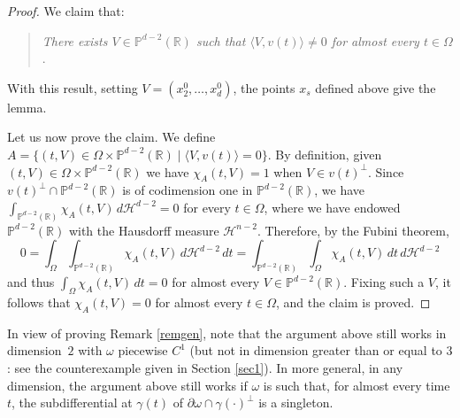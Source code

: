 \documentclass[10pt]{amsart}
\def\R{\mathbb{R}}
\theoremstyle{definition}
\begin{document}
\begin{proof}
We claim that:
\begin{quote}
\textit{There exists $V\in \mathbb{P}^{d-2}(\R)$ such that $\langle V,v(t)\rangle\neq 0$ for almost every $t\in\Omega$}.
\end{quote}
With this result, setting $V=(x_2^0,\ldots,x_d^0)$, the points $x_s$ defined above give the lemma.

Let us now prove the claim.
We define $A=\{ (t,V)\in\Omega\times\mathbb{P}^{d-2}(\R)\mid \langle V,v(t)\rangle=0\}$. By definition, given $(t,V)\in\Omega\times\mathbb{P}^{d-2}(\R)$ we have $\chi_A(t,V)=1$ when $V\in v(t)^\perp$. Since $v(t)^\perp\cap\mathbb{P}^{d-2}(\R)$ is of codimension one in $\mathbb{P}^{d-2}(\R)$, we have $\int_{\mathbb{P}^{d-2}(\R)} \chi_A(t,V)\, d\mathcal{H}^{d-2}=0$ for every $t\in\Omega$, where we have endowed $\mathbb{P}^{d-2}(\R)$ with the Hausdorff measure $\mathcal{H}^{n-2}$. Therefore, by the Fubini theorem,
\[
0 = \int_\Omega \int_{\mathbb{P}^{d-2}(\R)} \chi_A(t,V)\, d\mathcal{H}^{d-2}\, dt = \int_{\mathbb{P}^{d-2}(\R)} \int_\Omega \chi_A(t,V)\, dt\, d\mathcal{H}^{d-2}
\]
and thus $\int_\Omega \chi_A(t,V)\, dt=0$ for almost every $V\in\mathbb{P}^{d-2}(\R)$. Fixing such a $V$, it follows that $\chi_A(t,V)=0$ for almost every $t\in\Omega$, and the claim is proved.
\end{proof}

In view of proving Remark \ref{remgen}, note that the argument above still works in dimension~$2$ with $\omega$ piecewise $C^1$ (but not in dimension greater than or equal to $3$: see the counterexample given in Section \ref{sec1}).
In more general, in any dimension, the argument above still works if $\omega$ is such that, for almost every time $t$, the subdifferential at $\gamma(t)$ of $\partial\omega\cap\gamma(\cdot)^\perp$ is a singleton.
\end{document}
